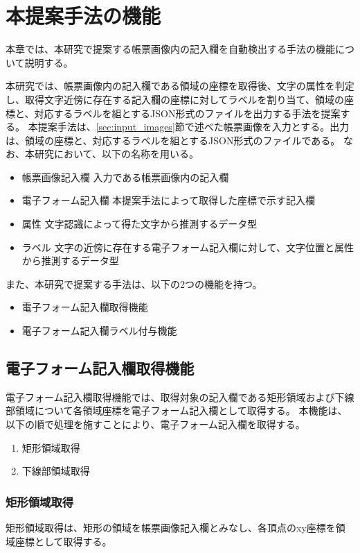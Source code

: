 \chapter{本提案手法の機能}\label{cha:Function}
本章では、本研究で提案する帳票画像内の記入欄を自動検出する手法の機能について説明する。

本研究では、帳票画像内の記入欄である領域の座標を取得後、文字の属性を判定し、取得文字近傍に存在する記入欄の座標に対してラベルを割り当て、領域の座標と、対応するラベルを組とするJSON形式のファイルを出力する手法を提案する。
本提案手法は、\ref{sec:input_images}節で述べた帳票画像を入力とする。出力は、領域の座標と、対応するラベルを組とするJSON形式のファイルである。
なお、本研究において、以下の名称を用いる。

\begin{itemize}
	\item 帳票画像記入欄
  		入力である帳票画像内の記入欄
	\item 電子フォーム記入欄
		本提案手法によって取得した座標で示す記入欄
	\item 属性
		文字認識によって得た文字から推測するデータ型
	\item ラベル
		文字の近傍に存在する電子フォーム記入欄に対して、文字位置と属性から推測するデータ型
\end{itemize}

また、本研究で提案する手法は、以下の2つの機能を持つ。

\begin{itemize}
  \item 電子フォーム記入欄取得機能
  \item 電子フォーム記入欄ラベル付与機能
\end{itemize}


\section{電子フォーム記入欄取得機能}\label{sec:eform_write_space_obtainment_feature}
電子フォーム記入欄取得機能では、取得対象の記入欄である矩形領域および下線部領域について各領域座標を電子フォーム記入欄として取得する。
本機能は、以下の順で処理を施すことにより、電子フォーム記入欄を取得する。

\begin{enumerate}
  \item 矩形領域取得
  \item 下線部領域取得
\end{enumerate}

\subsection{矩形領域取得}\label{subsec:rect_coords_obtainment}
矩形領域取得は、矩形の領域を帳票画像記入欄とみなし、各頂点のxy座標を領域座標として取得する。

